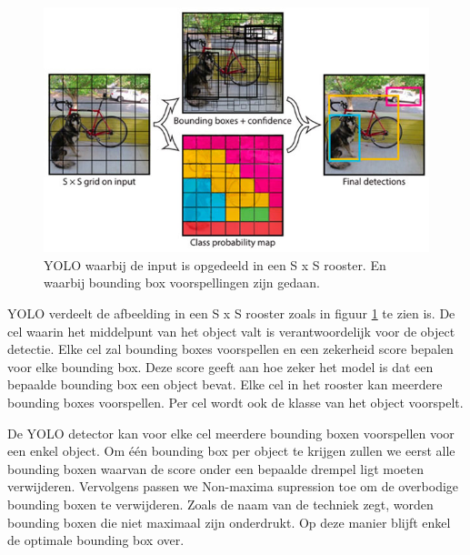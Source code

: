 \begin{figure}[!ht]
	\centering
	\includegraphics[width=0.60\linewidth]{fig/YOLO.jpg}
	\caption{YOLO waarbij de input is opgedeeld in een S x S rooster. 
	En waarbij bounding box voorspellingen zijn gedaan.}
	\label{fig:yolo}
\end{figure}

YOLO \cite{redmon_you_2016} verdeelt de afbeelding in een S x S rooster zoals in figuur \ref{fig:yolo} te zien is. 
De cel waarin het middelpunt van het object valt is verantwoordelijk voor de object detectie.
Elke cel zal bounding boxes voorspellen en een zekerheid score bepalen voor elke bounding box. 
Deze score geeft aan hoe zeker het model is dat een bepaalde bounding box een object bevat.
Elke cel in het rooster kan meerdere bounding boxes voorspellen.
Per cel wordt ook de klasse van het object voorspelt.

De YOLO detector kan voor elke cel meerdere bounding boxen voorspellen voor een enkel object.
Om \'e\'en bounding box per object te krijgen zullen we eerst alle bounding boxen waarvan de score onder een bepaalde drempel ligt moeten verwijderen.
Vervolgens passen we Non-maxima supression toe om de overbodige bounding boxen te verwijderen. 
Zoals de naam van de techniek zegt, worden bounding boxen die niet maximaal zijn onderdrukt.
Op deze manier blijft enkel de optimale bounding box over.


